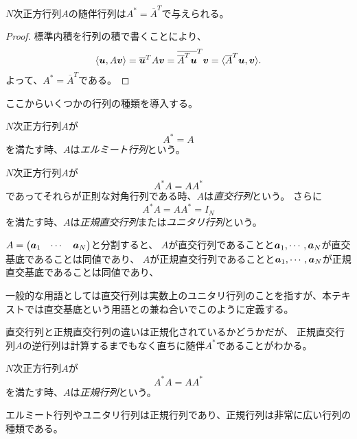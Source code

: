 \begin{proposition}[随伴行列]
$N$次正方行列$A$の随伴行列は$A^* = \overline{A}^T$で与えられる。
\end{proposition}

\begin{proof}
標準内積を行列の積で書くことにより、
$$
\langle\vb*{u}, A\vb*{v}\rangle
= \overline{\vb*{u}}^T A\vb*{v}
= \overline{\overline{A}^T \vb*{u}}^T \vb*{v}
= \langle\overline{A}^T \vb*{u}, \vb*{v}\rangle.
$$
よって、$A^* = \overline{A}^T$である。
\end{proof}

ここからいくつかの行列の種類を導入する。

\begin{definition}[エルミート行列]
$N$次正方行列$A$が
$$
A^* = A
$$
を満たす時、$A$は\emph{エルミート行列}という。
\end{definition}

\begin{definition}[ユニタリ行列]
$N$次正方行列$A$が
$$
A^* A = A A^*
$$
であってそれらが正則な対角行列である時、$A$は\emph{直交行列}という。
さらに
$$
A^* A = A A^* = I_N
$$
を満たす時、$A$は\emph{正規直交行列}または\emph{ユニタリ行列}という。
\end{definition}

\begin{remark}
$A = \begin{pmatrix}\vb*{a}_1 & \cdots & \vb*{a}_N\end{pmatrix}$と分割すると、
$A$が直交行列であることと$\vb*{a}_1, \cdots, \vb*{a}_N$が直交基底であることは同値であり、
$A$が正規直交行列であることと$\vb*{a}_1, \cdots, \vb*{a}_N$が正規直交基底であることは同値であり、
\end{remark}

一般的な用語としては直交行列は実数上のユニタリ行列のことを指すが、本テキストでは直交基底という用語との兼ね合いでこのように定義する。

直交行列と正規直交行列の違いは正規化されているかどうかだが、
正規直交行列$A$の逆行列は計算するまでもなく直ちに随伴$A^*$であることがわかる。

\begin{definition}[正規行列]
$N$次正方行列$A$が
$$
A^* A = A A^*
$$
を満たす時、$A$は\emph{正規行列}という。
\end{definition}

\begin{remark}
エルミート行列やユニタリ行列は正規行列であり、正規行列は非常に広い行列の種類である。
\end{remark}

